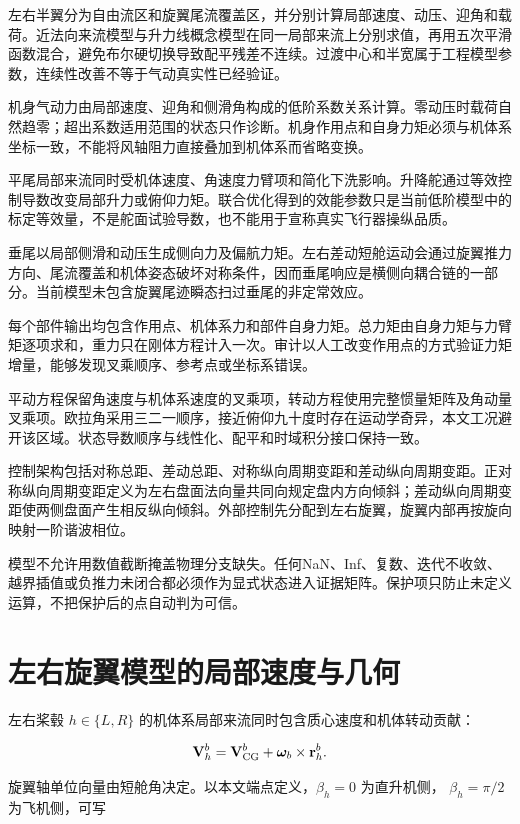 \documentclass[UTF8,12pt,oneside,openany,fontset=windows]{ctexbook}
\begin{document}
左右半翼分为自由流区和旋翼尾流覆盖区，并分别计算局部速度、动压、迎角和载荷。近法向来流模型与升力线概念模型在同一局部来流上分别求值，再用五次平滑函数混合，避免布尔硬切换导致配平残差不连续。过渡中心和半宽属于工程模型参数，连续性改善不等于气动真实性已经验证。

机身气动力由局部速度、迎角和侧滑角构成的低阶系数关系计算。零动压时载荷自然趋零；超出系数适用范围的状态只作诊断。机身作用点和自身力矩必须与机体系坐标一致，不能将风轴阻力直接叠加到机体系而省略变换。

平尾局部来流同时受机体速度、角速度力臂项和简化下洗影响。升降舵通过等效控制导数改变局部升力或俯仰力矩。联合优化得到的效能参数只是当前低阶模型中的标定等效量，不是舵面试验导数，也不能用于宣称真实飞行器操纵品质。

垂尾以局部侧滑和动压生成侧向力及偏航力矩。左右差动短舱运动会通过旋翼推力方向、尾流覆盖和机体姿态破坏对称条件，因而垂尾响应是横侧向耦合链的一部分。当前模型未包含旋翼尾迹瞬态扫过垂尾的非定常效应。

每个部件输出均包含作用点、机体系力和部件自身力矩。总力矩由自身力矩与力臂矩逐项求和，重力只在刚体方程计入一次。审计以人工改变作用点的方式验证力矩增量，能够发现叉乘顺序、参考点或坐标系错误。

平动方程保留角速度与机体系速度的叉乘项，转动方程使用完整惯量矩阵及角动量叉乘项。欧拉角采用三二一顺序，接近俯仰九十度时存在运动学奇异，本文工况避开该区域。状态导数顺序与线性化、配平和时域积分接口保持一致。

控制架构包括对称总距、差动总距、对称纵向周期变距和差动纵向周期变距。正对称纵向周期变距定义为左右盘面法向量共同向规定盘内方向倾斜；差动纵向周期变距使两侧盘面产生相反纵向倾斜。外部控制先分配到左右旋翼，旋翼内部再按旋向映射一阶谐波相位。

模型不允许用数值截断掩盖物理分支缺失。任何NaN、Inf、复数、迭代不收敛、越界插值或负推力未闭合都必须作为显式状态进入证据矩阵。保护项只防止未定义运算，不把保护后的点自动判为可信。

\section{左右旋翼模型的局部速度与几何}

左右桨毂 \(h\in\{L,R\}\) 的机体系局部来流同时包含质心速度和机体转动贡献：

\begin{equation}
\mathbf V_h^b=\mathbf V_{\rm CG}^b+\boldsymbol\omega_b\times\mathbf r_h^b.
\end{equation}

旋翼轴单位向量由短舱角决定。以本文端点定义，\(\beta_h=0\) 为直升机侧， \(\beta_h=\pi/2\) 为飞机侧，可写
\end{document}
